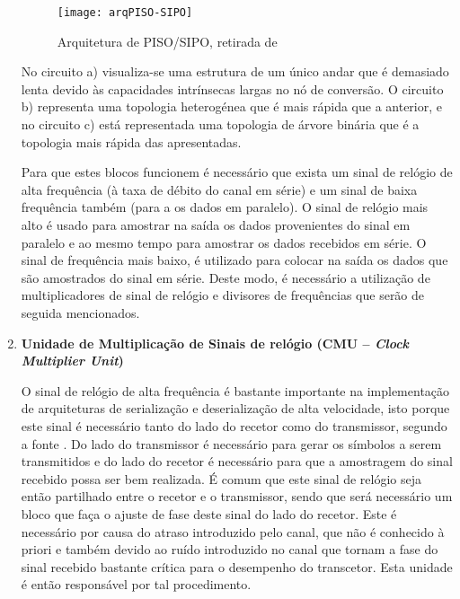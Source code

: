 \begin{enumerate}
	\begin{figure}[h!]
		\begin{center}
			\leavevmode
			\texttt{[image: arqPISO-SIPO]}
			\caption{Arquitetura de PISO/SIPO, retirada de \cite{R012}}
			\label{fig:PISO-SIPO}
		\end{center}
	\end{figure}
	
	\hspace{1.0em}No circuito a) visualiza-se uma estrutura de um único andar que é demasiado lenta devido às capacidades intrínsecas largas no nó de conversão. O circuito b) representa uma topologia heterogénea que é mais rápida que a anterior, e no circuito c) está representada uma topologia de árvore binária que é a topologia mais rápida das apresentadas. 
	
	\hspace{1.0em}Para que estes blocos funcionem é necessário que exista um sinal de relógio de alta frequência (à taxa de débito do canal em série) e um sinal de baixa frequência também (para a os dados em paralelo). O sinal de relógio mais alto é usado para amostrar na saída os dados provenientes do sinal em paralelo e ao mesmo tempo para amostrar os dados recebidos em série. O sinal de frequência mais baixo, é utilizado para colocar na saída os dados que são amostrados do sinal em série. Deste modo, é necessário a utilização de multiplicadores de sinal de relógio e divisores de frequências que serão de seguida mencionados.
	
	\item \textbf{Unidade de Multiplicação de Sinais de relógio (CMU – \textit{Clock Multiplier Unit})}
	
	\hspace{1.0em}O sinal de relógio de alta frequência é bastante importante na implementação de arquiteturas de serialização e deserialização de alta velocidade, isto porque este sinal é necessário tanto do lado do recetor como do transmissor, segundo a fonte \cite{R012}. Do lado do transmissor é necessário para gerar os símbolos a serem transmitidos e do lado do recetor é necessário para que a amostragem do sinal recebido possa ser bem realizada. É comum que este sinal de relógio seja então partilhado entre o recetor e o transmissor, sendo que será necessário um bloco que faça o ajuste de fase deste sinal do lado do recetor. Este é necessário por causa do atraso introduzido pelo canal, que não é conhecido à priori e também devido ao ruído introduzido no canal que tornam a fase do sinal recebido bastante crítica para o desempenho do transcetor. Esta unidade é então responsável por tal procedimento.
	

\end{enumerate}
